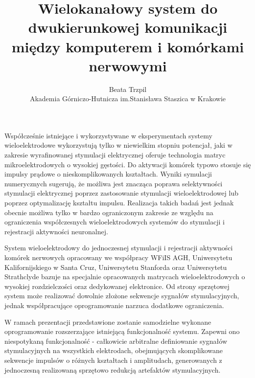 \documentclass[12pt, a4paper]{article}
\begin{document}
\title{Wielokanałowy system do dwukierunkowej komunikacji między komputerem i komórkami nerwowymi}
\author{Beata Trzpil \\Akademia Górniczo-Hutnicza im.Stanisława Staszica w Krakowie}
\date {}
\maketitle
\thispagestyle{title}
Współcześnie istniejące i wykorzystywane w eksperymentach systemy wieloelektrodowe wykorzystują tylko w niewielkim stopniu potencjał, jaki w zakresie wyrafinowanej stymulacji elektrycznej oferuje technologia matryc mikroelektrodowych o wysokiej gęstości. Do aktywacji komórek typowo stosuje się impulsy prądowe o nieskomplikowanych kształtach. Wyniki symulacji numerycznych sugerują, że możliwa jest znacząca poprawa selektywności stymulacji elektrycznej poprzez zastosowanie stymulacji wieloelektrodowej lub poprzez optymalizację kształtu impulsu. 
Realizacja takich badań jest jednak obecnie możliwa tylko w bardzo ograniczonym zakresie ze względu na ograniczenia współczesnych wieloelektrodowych systemów do stymulacji i rejestracji aktywności neuronalnej. 

System wieloelektrodowy do jednoczesnej stymulacji i rejestracji aktywności komórek nerwowych opracowany we współpracy WFiIS AGH, Uniwersytetu Kalifornijskiego w Santa Cruz, Uniwersytetu Stanforda oraz Uniwersytetu Strathclyde bazuje na specjalnie opracowanych matrycach wieloelektrodowych o wysokiej rozdzielczości oraz dedykowanej elektronice. Od strony sprzętowej system może realizować dowolnie złożone sekwencje sygnałów stymulacyjnych, jednak współpracujące oprogramowanie narzuca dodatkowe ograniczenia. 

W ramach prezentacji przedstawione zostanie samodzielne wykonane  oprogramowanie rozszerzające istniejącą funkcjonalność systemu. Zapewni ono niespotykaną funkcjonalność  - całkowicie arbitralne definiowanie sygnałów stymulacyjnych na wszystkich elektrodach, obejmujących skomplikowane sekwencje impulsów o różnych kształtach i amplitudach, generowanych z jednoczesną realizowaną sprzętowo redukcją artefaktów stymulacyjnych. 
\end{document}
